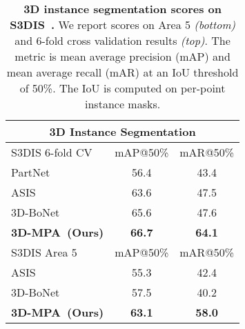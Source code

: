 \documentclass[10pt,twocolumn,letterpaper]{article}
\newcommand{\name}{3D-MPA}
\begin{document}
\begin{table}
	\center
    \vspace{-8px}
    \begin{tabular}{l c c}
        \toprule
        \multicolumn{3}{c}{\textbf{3D Instance Segmentation}}  \\ 
        \midrule
         S3DIS 6-fold CV \hspace{1cm} & mAP@50\% & mAR@50\%  \\
         \midrule
         PartNet~\cite{Mo19CVPR} & 56.4 & 43.4 \\
         ASIS~\cite{Wang19CVPR} & 63.6 & 47.5 \\
         3D-BoNet~\cite{Yang19CVPR} & 65.6 & 47.6 \\
         \textbf{\name~(Ours)} & \textbf{66.7} & \textbf{64.1}\\
         \midrule
         S3DIS Area 5 & mAP@50\% & mAR@50\%  \\
         \midrule
         ASIS~\cite{Wang19CVPR} & 55.3 & 42.4 \\
         3D-BoNet~\cite{Yang19CVPR} & 57.5 & 40.2 \\
         \textbf{\name~(Ours)} & \textbf{63.1} & \textbf{58.0}\\
         \bottomrule
    \end{tabular}
    \vspace{-5px}
    \caption{\textbf{3D instance segmentation scores on S3DIS~\cite{Armeni16CVPR}.} We report scores on Area 5 \emph{(bottom)} and 6-fold cross validation results \emph{(top)}. The metric is mean average precision (mAP) and mean average recall (mAR) at an IoU threshold of 50\%. The IoU is computed on per-point instance masks.}
    \label{tab:inst_stan}
\end{table} 
\end{document}

